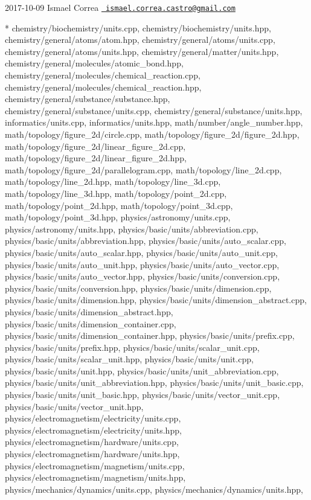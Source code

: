  2017-\/10-\/09 Ismael Correa \href{mailto:ismael.correa.castro@gmail.com}{\texttt{ ismael.\+correa.\+castro@gmail.\+com}} \begin{DoxyVerb}* chemistry/biochemistry/units.cpp,
chemistry/biochemistry/units.hpp, chemistry/general/atoms/atom.hpp,
chemistry/general/atoms/units.cpp,
chemistry/general/atoms/units.hpp,
chemistry/general/matter/units.hpp,
chemistry/general/molecules/atomic_bond.hpp,
chemistry/general/molecules/chemical_reaction.cpp,
chemistry/general/molecules/chemical_reaction.hpp,
chemistry/general/substance/substance.hpp,
chemistry/general/substance/units.cpp,
chemistry/general/substance/units.hpp, informatics/units.cpp,
informatics/units.hpp, math/number/angle_number.hpp,
math/topology/figure_2d/circle.cpp,
math/topology/figure_2d/figure_2d.hpp,
math/topology/figure_2d/linear_figure_2d.cpp,
math/topology/figure_2d/linear_figure_2d.hpp,
math/topology/figure_2d/parallelogram.cpp,
math/topology/line_2d.cpp, math/topology/line_2d.hpp,
math/topology/line_3d.cpp, math/topology/line_3d.hpp,
math/topology/point_2d.cpp, math/topology/point_2d.hpp,
math/topology/point_3d.cpp, math/topology/point_3d.hpp,
physics/astronomy/units.cpp, physics/astronomy/units.hpp,
physics/basic/units/abbreviation.cpp,
physics/basic/units/abbreviation.hpp,
physics/basic/units/auto_scalar.cpp,
physics/basic/units/auto_scalar.hpp,
physics/basic/units/auto_unit.cpp,
physics/basic/units/auto_unit.hpp,
physics/basic/units/auto_vector.cpp,
physics/basic/units/auto_vector.hpp,
physics/basic/units/conversion.cpp,
physics/basic/units/conversion.hpp,
physics/basic/units/dimension.cpp,
physics/basic/units/dimension.hpp,
physics/basic/units/dimension_abstract.cpp,
physics/basic/units/dimension_abstract.hpp,
physics/basic/units/dimension_container.cpp,
physics/basic/units/dimension_container.hpp,
physics/basic/units/prefix.cpp, physics/basic/units/prefix.hpp,
physics/basic/units/scalar_unit.cpp,
physics/basic/units/scalar_unit.hpp, physics/basic/units/unit.cpp,
physics/basic/units/unit.hpp,
physics/basic/units/unit_abbreviation.cpp,
physics/basic/units/unit_abbreviation.hpp,
physics/basic/units/unit_basic.cpp,
physics/basic/units/unit_basic.hpp,
physics/basic/units/vector_unit.cpp,
physics/basic/units/vector_unit.hpp,
physics/electromagnetism/electricity/units.cpp,
physics/electromagnetism/electricity/units.hpp,
physics/electromagnetism/hardware/units.cpp,
physics/electromagnetism/hardware/units.hpp,
physics/electromagnetism/magnetism/units.cpp,
physics/electromagnetism/magnetism/units.hpp,
physics/mechanics/dynamics/units.cpp,
physics/mechanics/dynamics/units.hpp,

\end{DoxyVerb}
